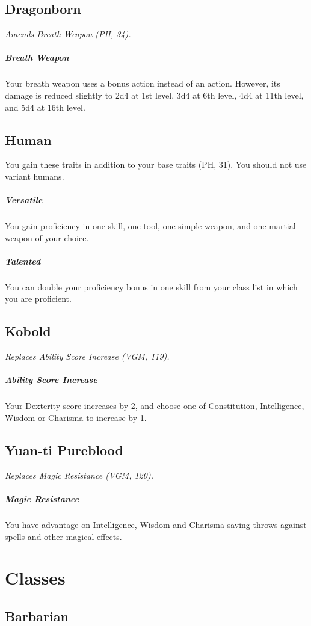 \documentclass[letterpaper,twocolumn,openany,nodeprecatedcode]{dndbook}
\begin{document}
\label{balance-race-dragonborn}
\subsection{Dragonborn}
\textit{Amends Breath Weapon (PH, 34).}

\subparagraph{Breath Weapon} Your breath weapon uses a bonus action instead of an action. However, its damage is reduced slightly to 2d4 at 1st level, 3d4 at 6th level, 4d4 at 11th level, and 5d4 at 16th level.

\label{balance-race-human}
\subsection{Human}

You gain these traits in addition to your base traits (PH, 31). You should not use variant humans.

\subparagraph{Versatile} You gain proficiency in one skill, one tool, one simple weapon, and one martial weapon of your choice.
\subparagraph{Talented} You can double your proficiency bonus in one skill from your class list in which you are proficient.

\label{balance-race-kobold}
\subsection{Kobold}
\textit{Replaces Ability Score Increase (VGM, 119).}

\subparagraph{Ability Score Increase} Your Dexterity score increases by 2, and choose one of Constitution, Intelligence, Wisdom or Charisma to increase by 1.

\label{balance-race-yuanti}
\subsection{Yuan-ti Pureblood}
\textit{Replaces Magic Resistance (VGM, 120).}

\subparagraph{Magic Resistance} You have advantage on Intelligence, Wisdom and Charisma saving throws against spells and other magical effects.

\label{balance-classes}
\section{Classes}

\subsection{Barbarian}
\end{document}
